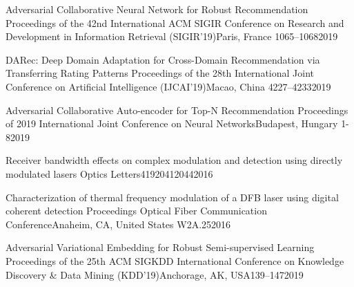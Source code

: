 


\begin{cvpubs}[fontsize=12pt, series=papers, top=-0.5mm]

    {Adversarial Collaborative Neural Network for Robust Recommendation}%
    {Proceedings of the 42nd International ACM SIGIR Conference on Research and Development in Information Retrieval (SIGIR’19)}{Paris, France}{}%
    {1065–1068}{}{2019}

    {DARec: Deep Domain Adaptation for Cross-Domain Recommendation via Transferring Rating Patterns}%
    {Proceedings of the 28th International Joint Conference on Artificial Intelligence (IJCAI'19)}{Macao, China}%
    {}{4227--4233}{}{2019}

    {Adversarial Collaborative Auto-encoder for Top-N Recommendation}%
    {Proceedings of 2019 International Joint Conference on Neural Networks}{Budapest, Hungary}{}%
    {1-8}{}{2019}

    {Receiver bandwidth effects on complex modulation and detection using directly modulated lasers}%
    {Optics Letters}{41}{9}{2041}{2044}{2016}

    {Characterization of thermal frequency modulation of a DFB laser using digital coherent detection}%
    {Proceedings Optical Fiber Communication Conference}{Anaheim, CA, United States}{}%
    {W2A.25}{}{2016}

    {Adversarial Variational Embedding for Robust Semi-supervised Learning}%
    {Proceedings of the 25th ACM SIGKDD International Conference on Knowledge Discovery \& Data Mining (KDD'19)}{Anchorage, AK, USA}{}{139–147}{}{2019}


\end{cvpubs}
